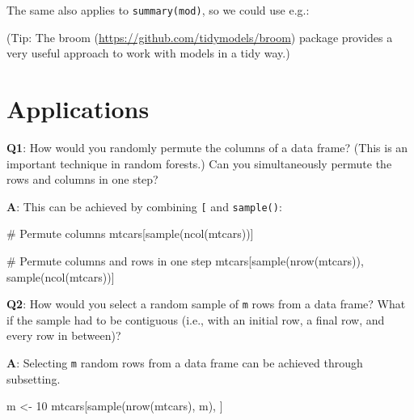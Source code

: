 \documentclass[
]{krantz}
\makeatletter
\newenvironment{Shaded}{\begin{snugshade}}{\end{snugshade}}
\newcommand{\CommentTok}[1]{\textcolor[rgb]{0.56,0.35,0.01}{\textit{#1}}}
\newcommand{\DecValTok}[1]{\textcolor[rgb]{0.00,0.00,0.81}{#1}}
\newcommand{\KeywordTok}[1]{\textcolor[rgb]{0.13,0.29,0.53}{\textbf{#1}}}
\newcommand{\NormalTok}[1]{#1}
\newcommand{\OperatorTok}[1]{\textcolor[rgb]{0.81,0.36,0.00}{\textbf{#1}}}
\newcommand{\StringTok}[1]{\textcolor[rgb]{0.31,0.60,0.02}{#1}}
\renewcommand{\href}[2]{#2 (\url{#1})}
\newenvironment{kframe}{%
\medskip{}
\setlength{\fboxsep}{.8em}
 \def\at@end@of@kframe{}%
 \ifinner\ifhmode%
  \def\at@end@of@kframe{\end{minipage}}%
  \begin{minipage}{\columnwidth}%
 \fi\fi%
 \def\FrameCommand##1{\hskip\@totalleftmargin \hskip-\fboxsep
 \colorbox{shadecolor}{##1}\hskip-\fboxsep
     \hskip-\linewidth \hskip-\@totalleftmargin \hskip\columnwidth}%
 \MakeFramed {\advance\hsize-\width
   \@totalleftmargin\z@ \linewidth\hsize
   \@setminipage}}%
 {\par\unskip\endMakeFramed%
 \at@end@of@kframe}
\renewenvironment{Shaded}{\begin{kframe}}{\end{kframe}}
\renewcommand{\KeywordTok} [1]{\textcolor[rgb]{0.00,0.44,0.13}{{#1}}}
\renewcommand{\DecValTok}  [1]{\textcolor[rgb]{0.25,0.63,0.44}{{#1}}}
\renewcommand{\StringTok}  [1]{\textcolor[rgb]{0.25,0.44,0.63}{{#1}}}
\renewcommand{\CommentTok} [1]{\textcolor[rgb]{0.38,0.63,0.69}{{#1}}}
\renewcommand{\NormalTok}  [1]{{#1}}
\makeatother
\begin{document}
The same also applies to \texttt{summary(mod)}, so we could use e.g.:

\begin{Shaded}
\end{Shaded}

(Tip: The \href{https://github.com/tidymodels/broom}{broom} package provides a very useful approach to work with models in a tidy way.)


\hypertarget{applications}{%
\section{Applications}\label{applications}}

\textbf{{Q1}}: How would you randomly permute the columns of a data frame? (This is an important technique in random forests.) Can you simultaneously permute the rows and columns in one step?

\textbf{{A}}: This can be achieved by combining \texttt{{[}} and \texttt{sample()}:

\begin{Shaded}
\begin{Highlighting}[]
\CommentTok{# Permute columns}
\NormalTok{mtcars[}\KeywordTok{sample}\NormalTok{(}\KeywordTok{ncol}\NormalTok{(mtcars))]}

\CommentTok{# Permute columns and rows in one step}
\NormalTok{mtcars[}\KeywordTok{sample}\NormalTok{(}\KeywordTok{nrow}\NormalTok{(mtcars)), }\KeywordTok{sample}\NormalTok{(}\KeywordTok{ncol}\NormalTok{(mtcars))]}
\end{Highlighting}
\end{Shaded}

\textbf{{Q2}}: How would you select a random sample of \texttt{m} rows from a data frame? What if the sample had to be contiguous (i.e., with an initial row, a final row, and every row in between)?

\textbf{{A}}: Selecting \texttt{m} random rows from a data frame can be achieved through subsetting.

\begin{Shaded}
\begin{Highlighting}[]
\NormalTok{m <-}\StringTok{ }\DecValTok{10}
\NormalTok{mtcars[}\KeywordTok{sample}\NormalTok{(}\KeywordTok{nrow}\NormalTok{(mtcars), m), ]}
\end{Highlighting}
\end{Shaded}
\end{document}
